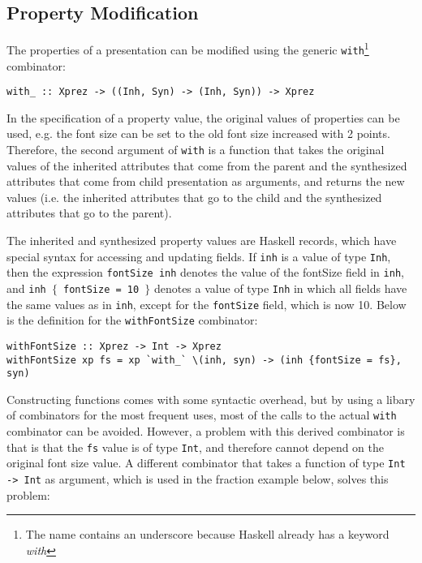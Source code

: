 %																
\subsection{Property Modification}

The properties of a presentation can be modified using the generic \texttt{with}\footnote{The name contains an underscore because Haskell already has a keyword {\em with}} combinator:

\begin{small}
\begin{verbatim}
with_ :: Xprez -> ((Inh, Syn) -> (Inh, Syn)) -> Xprez
\end{verbatim}
\end{small}

In the specification of a property value, the original values of properties can be used, e.g. the font size can be set to the old font size increased with 2 points. Therefore, the second argument of \texttt{with} is a function that takes the original values of the inherited attributes that come from the parent and the synthesized attributes that come from child presentation as arguments, and returns the new values (i.e. the inherited attributes that go to the child and the synthesized attributes that go to the parent).

The inherited and synthesized property values are Haskell records, which have special syntax for accessing and updating fields. If \texttt{inh} is a value of type \texttt{Inh}, then the expression \texttt{fontSize inh} denotes the value of the fontSize field in \texttt{inh}, and \texttt{inh $\{$ fontSize = 10 $\}$} denotes a value of type \texttt{Inh} in which all fields have the same values as in \texttt{inh}, except for the \texttt{fontSize} field, which is now 10. Below is the definition for the \texttt{withFontSize} combinator: 

\begin{small}
\begin{verbatim}
withFontSize :: Xprez -> Int -> Xprez
withFontSize xp fs = xp `with_` \(inh, syn) -> (inh {fontSize = fs}, syn)
\end{verbatim}
\end{small}

Constructing functions comes with some syntactic overhead, but by using a libary of combinators for the most frequent uses, most of the calls to the actual \texttt{with} combinator can be avoided. However, a problem with this derived combinator is that is that the \texttt{fs} value is of type \texttt{Int}, and therefore cannot depend on the original font size value. A different combinator that takes a function of type \texttt{Int -> Int} as argument, which is used in the fraction example below, solves this problem:

